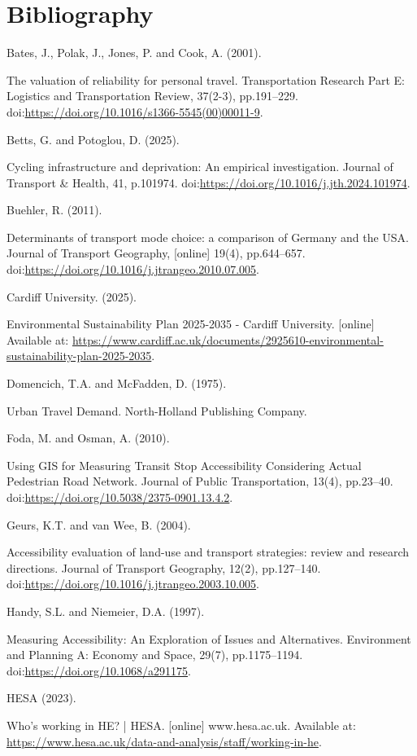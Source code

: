 \documentclass[11pt,a4paper]{article}
\begin{document}
\section*{Bibliography}
\begin{sloppypar}

\hypertarget{bates2001}{Bates, J., Polak, J., Jones, P. and Cook, A. (2001).}  The valuation of reliability for personal travel. Transportation Research Part E: Logistics and Transportation Review, 37(2-3), pp.191–229. doi:\url{https://doi.org/10.1016/s1366-5545(00)00011-9}.

\hypertarget{betts2025}{Betts, G. and Potoglou, D. (2025).} Cycling infrastructure and deprivation: An empirical investigation. Journal of Transport \& Health, 41, p.101974. doi:\url{https://doi.org/10.1016/j.jth.2024.101974}.

\hypertarget{buehler2011}{Buehler, R. (2011).} Determinants of transport mode choice: a comparison of Germany and the USA. Journal of Transport Geography, [online] 19(4), pp.644–657. doi:\url{https://doi.org/10.1016/j.jtrangeo.2010.07.005}.

\hypertarget{cardiff2025}{Cardiff University. (2025).} Environmental Sustainability Plan 2025-2035 - Cardiff University. [online] Available at: \url{https://www.cardiff.ac.uk/documents/2925610-environmental-sustainability-plan-2025-2035}.

\hypertarget{domencich1975}{Domencich, T.A. and McFadden, D. (1975).} Urban Travel Demand. North-Holland Publishing Company.

\hypertarget{foda2010}{Foda, M. and Osman, A. (2010).} Using GIS for Measuring Transit Stop Accessibility Considering Actual Pedestrian Road Network. Journal of Public Transportation, 13(4), pp.23–40. doi:\url{https://doi.org/10.5038/2375-0901.13.4.2}.

\hypertarget{geurs2004}{Geurs, K.T. and van Wee, B. (2004).} Accessibility evaluation of land-use and transport strategies: review and research directions. Journal of Transport Geography, 12(2), pp.127–140. doi:\url{https://doi.org/10.1016/j.jtrangeo.2003.10.005}.

\hypertarget{handy1997}{Handy, S.L. and Niemeier, D.A. (1997).} Measuring Accessibility: An Exploration of Issues and Alternatives. Environment and Planning A: Economy and Space, 29(7), pp.1175–1194. doi:\url{https://doi.org/10.1068/a291175}.

\hypertarget{hesa2023}{HESA (2023).} Who’s working in HE? | HESA. [online] www.hesa.ac.uk. Available at: \url{https://www.hesa.ac.uk/data-and-analysis/staff/working-in-he}.


\end{sloppypar}
\end{document}
